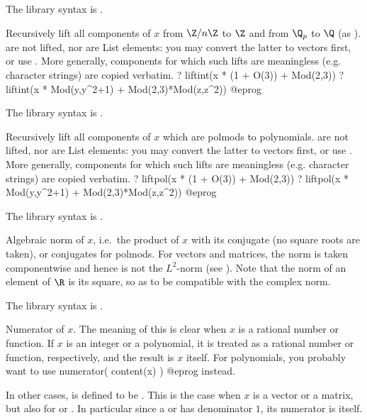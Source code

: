 The library syntax is .

\label{se:liftint}
Recursively lift all components of $x$ from $\Z/n\Z$ to $\Z$ and
from $\Q_p$ to $\Q$ (as ).
 are not lifted, nor are List elements: you may
convert the latter to vectors first, or use . More
generally, components for which such lifts are meaningless (e.g. character
strings) are copied verbatim.
\bprog
? liftint(x * (1 + O(3)) + Mod(2,3))
? liftint(x * Mod(y,y^2+1) + Mod(2,3)*Mod(z,z^2))
@eprog

The library syntax is .

\label{se:liftpol}
Recursively lift all components of $x$ which are polmods to
polynomials.  are not lifted, nor are List elements: you may
convert the latter to vectors first, or use . More
generally, components for which such lifts are meaningless (e.g. character
strings) are copied verbatim.
\bprog
? liftpol(x * (1 + O(3)) + Mod(2,3))
? liftpol(x * Mod(y,y^2+1) + Mod(2,3)*Mod(z,z^2))
@eprog

The library syntax is .

\label{se:norm}
Algebraic norm of $x$, i.e.~the product of $x$ with
its conjugate (no square roots are taken), or conjugates for polmods. For
vectors and matrices, the norm is taken componentwise and hence is not the
$L^2$-norm (see ). Note that the norm of an element of
$\R$ is its square, so as to be compatible with the complex norm.

The library syntax is .

\label{se:numerator}
Numerator of $x$. The meaning of this
is clear when $x$ is a rational number or function. If $x$ is an integer
or a polynomial, it is treated as a rational number or function,
respectively, and the result is $x$ itself. For polynomials, you
probably want to use
\bprog
numerator( content(x) )
@eprog\noindent
instead.

In other cases,  is defined to be
. This is the case when $x$ is a vector or a
matrix, but also for  or . In particular since a
 or  has  denominator $1$, its numerator is
itself.


